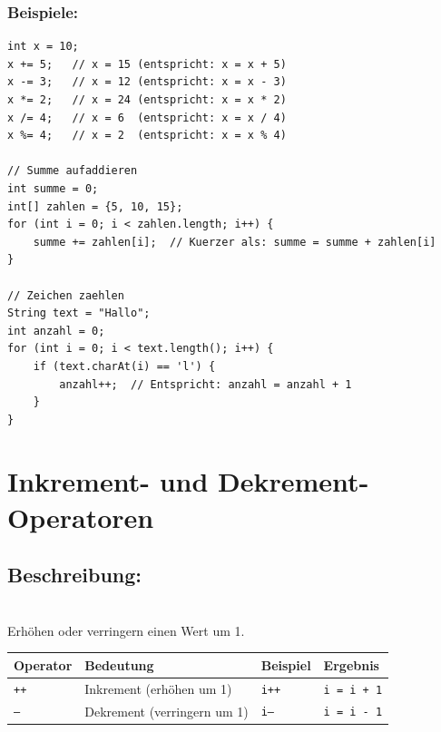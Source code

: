 \subsubsection*{Beispiele:}
\begin{lstlisting}
int x = 10;
x += 5;   // x = 15 (entspricht: x = x + 5)
x -= 3;   // x = 12 (entspricht: x = x - 3)
x *= 2;   // x = 24 (entspricht: x = x * 2)
x /= 4;   // x = 6  (entspricht: x = x / 4)
x %= 4;   // x = 2  (entspricht: x = x % 4)

// Summe aufaddieren
int summe = 0;
int[] zahlen = {5, 10, 15};
for (int i = 0; i < zahlen.length; i++) {
    summe += zahlen[i];  // Kuerzer als: summe = summe + zahlen[i]
}

// Zeichen zaehlen
String text = "Hallo";
int anzahl = 0;
for (int i = 0; i < text.length(); i++) {
    if (text.charAt(i) == 'l') {
        anzahl++;  // Entspricht: anzahl = anzahl + 1
    }
}
\end{lstlisting}

\newpage


\section*{Inkrement- und Dekrement-Operatoren}

\subsection*{Beschreibung:}\\
Erhöhen oder verringern einen Wert um 1.

\begin{center}
	\begin{tabular}{|l|l|l|l|}
		\hline
		\textbf{Operator} & \textbf{Bedeutung} & \textbf{Beispiel} & \textbf{Ergebnis} \\
		\hline
		\texttt{++} & Inkrement (erhöhen um 1) & \texttt{i++} & \texttt{i = i + 1} \\
		\hline
		\texttt{--} & Dekrement (verringern um 1) & \texttt{i--} & \texttt{i = i - 1} \\
		\hline
	\end{tabular}
\end{center}

